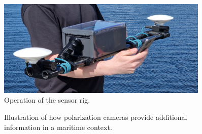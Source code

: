\documentclass{iopconfser}
\begin{document}
\pagebreak
\begin{figure}[H]
    \centering
    \includegraphics[width=0.9\textwidth]{figures/operation.jpg}
    \caption{Operation of the sensor rig.}
\end{figure}


\begin{figure}[H]
    \hfill
    \caption{Illustration of how polarization cameras provide additional information in a maritime context.}
    \label{fig:polarization_visualization}
\end{figure}
\end{document}
